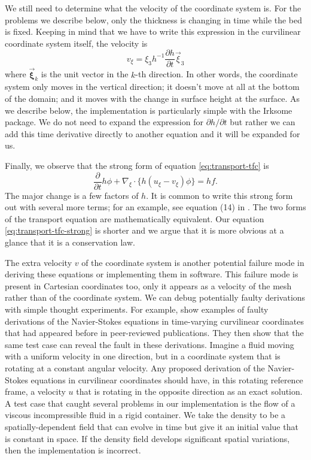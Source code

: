 \documentclass[gmd, manuscript]{copernicus}
\begin{document}
We still need to determine what the velocity of the coordinate system is.
For the problems we describe below, only the thickness is changing in time while the bed is fixed.
Keeping in mind that we have to write this expression in the curvilinear coordinate system itself, the velocity is
\begin{equation}
    v_\xi = \xi_3h^{-1}\frac{\partial h}{\partial t}\vec{\xi}_3
    \label{eq:tfc-coord-velocity}
\end{equation}
where $\vec{\mathbf \xi}_k$ is the unit vector in the $k$-th direction.
In other words, the coordinate system only moves in the vertical direction; it doesn't move at all at the bottom of the domain; and it moves with the change in surface height at the surface.
As we describe below, the implementation is particularly simple with the Irksome package.
We do not need to expand the expression for $\partial h/\partial t$ but rather we can add this time derivative directly to another equation and it will be expanded for us.

Finally, we observe that the strong form of equation \eqref{eq:transport-tfc} is
\begin{equation}
    \frac{\partial}{\partial t}h\phi + \nabla_\xi\cdot\{h(u_\xi - v_\xi)\phi\} = hf.
    \label{eq:transport-tfc-strong}
\end{equation}
The major change is a few factors of $h$.
It is common to write this strong form out with several more terms; for an example, see equation (14) in \citet{anderson2016modeling}.
The two forms of the transport equation are mathematically equivalent.
Our equation \eqref{eq:transport-tfc-strong} is shorter and we argue that it is more obvious at a glance that it is a conservation law.

The extra velocity $v$ of the coordinate system is another potential failure mode in deriving these equations or implementing them in software.
This failure mode is present in Cartesian coordinates too, only it appears as a velocity of the mesh rather than of the coordinate system.
We can debug potentially faulty derivations with simple thought experiments.
For example, \citet{luo2004contravariant} show examples of faulty derivations of the Navier-Stokes equations in time-varying curvilinear coordinates that had appeared before in peer-reviewed publications.
They then show that the same test case can reveal the fault in these derivations.
Imagine a fluid moving with a uniform velocity in one direction, but in a coordinate system that is rotating at a constant angular velocity.
Any proposed derivation of the Navier-Stokes equations in curvilinear coordinates should have, in this rotating reference frame, a velocity $u$ that is rotating in the opposite direction as an exact solution.
A test case that caught several problems in our implementation is the flow of a viscous incompressible fluid in a rigid container.
We take the density to be a spatially-dependent field that can evolve in time but give it an initial value that is constant in space.
If the density field develops significant spatial variations, then the implementation is incorrect.
\end{document}
